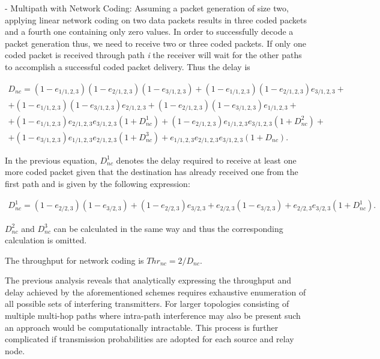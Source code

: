 \documentclass[journal, onecolumn, 12pt]{IEEEtran}
\begin{document}
- Multipath with Network Coding:
Assuming a packet generation of size two, applying linear network coding on two data packets results in three coded packets and a fourth one containing only zero values.
In order to successfully decode a packet generation thus, we need to receive two or three coded packets.
If only one coded packet is received through path \textit{i} the receiver will wait for the other paths to accomplish
a successful coded packet delivery. Thus the delay is

\begin{equation}
\begin{aligned}
D_{nc} = (1-e_{1/1,2,3})(1-e_{2/1,2,3})(1-e_{3/1,2,3}) + (1-e_{1/1,2,3})(1-e_{2/1,2,3})e_{3/1,2,3} + \\
+(1-e_{1/1,2,3})(1-e_{3/1,2,3})e_{2/1,2,3} +(1-e_{2/1,2,3})(1-e_{3/1,2,3})e_{1/1,2,3}+ \\
+(1-e_{1/1,2,3})e_{2/1,2,3}e_{3/1,2,3}(1+D_{nc}^{1})
+(1-e_{2/1,2,3})e_{1/1,2,3}e_{3/1,2,3}(1+D_{nc}^{2})+ \\
+(1-e_{3/1,2,3})e_{1/1,2,3}e_{2/1,2,3}(1+D_{nc}^{3})
+e_{1/1,2,3}e_{2/1,2,3}e_{3/1,2,3}(1+D_{nc}).
\end{aligned}
\end{equation}

In the previous equation, $D_{nc}^{1}$ denotes the delay required to receive at least one more coded packet given that the destination has already received one from the first path and is given by the following expression:

\begin{equation}
\begin{aligned}
D_{nc}^{1} = (1-e_{2/2,3})(1-e_{3/2,3})+ (1-e_{2/2,3})e_{3/2,3}
+e_{2/2,3}(1-e_{3/2,3})+ e_{2/2,3}e_{3/2,3} (1+D_{nc}^1).
\end{aligned}
\end{equation}

$D_{nc}^{2}$ and $D_{nc}^{3}$ can be calculated in the same way and thus the corresponding calculation is omitted.

The throughput for network coding is $Thr_{nc}=2/D_{nc}$.

The previous analysis reveals that analytically expressing the throughput and delay achieved by the aforementioned schemes requires exhaustive enumeration of all possible sets of interfering transmitters.
For larger topologies consisting of multiple multi-hop paths where intra-path interference may also be present such an approach would be computationally intractable.
This process is further complicated if transmission probabilities are adopted for each source and relay node.
\end{document}
